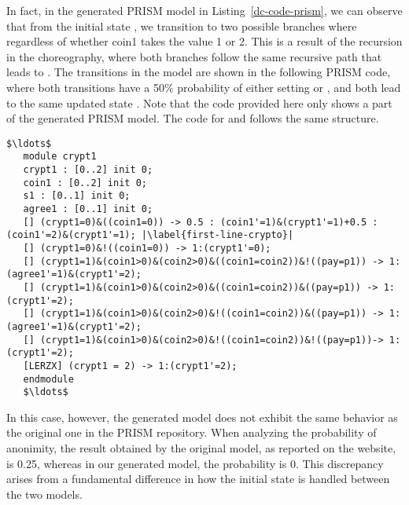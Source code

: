 In fact, in the generated PRISM model in Listing~\ref{dc-code-prism}, we can observe that from the initial state , we transition to two possible branches where  regardless of whether coin1 takes the value 1 or 2. This is a result of the recursion in the choreography, where both branches follow the same recursive path that leads to . The transitions in the model are shown in the following PRISM code, where both transitions have a 50$\%$ probability of either setting  or , and both lead to the same updated state . Note that the code provided here only shows a part of the generated PRISM model. The code for  and  follows the same structure.

\begin{lstlisting}[style=prism-color,caption={Generated PRISM program},captionpos=b,label={dc-code-prism},escapechar=|]
   $\ldots$
   module crypt1
   crypt1 : [0..2] init 0;
   coin1 : [0..2] init 0;
   s1 : [0..1] init 0;
   agree1 : [0..1] init 0;
   [] (crypt1=0)&((coin1=0)) -> 0.5 : (coin1'=1)&(crypt1'=1)+0.5 : (coin1'=2)&(crypt1'=1); |\label{first-line-crypto}|
   [] (crypt1=0)&!((coin1=0)) -> 1:(crypt1'=0);
   [] (crypt1=1)&(coin1>0)&(coin2>0)&((coin1=coin2))&!((pay=p1)) -> 1:(agree1'=1)&(crypt1'=2);
   [] (crypt1=1)&(coin1>0)&(coin2>0)&((coin1=coin2))&((pay=p1)) -> 1:(crypt1'=2);
   [] (crypt1=1)&(coin1>0)&(coin2>0)&!((coin1=coin2))&((pay=p1)) -> 1:(agree1'=1)&(crypt1'=2);
   [] (crypt1=1)&(coin1>0)&(coin2>0)&!((coin1=coin2))&!((pay=p1))-> 1:(crypt1'=2);
   [LERZX] (crypt1 = 2) -> 1:(crypt1'=2);
   endmodule
   $\ldots$
\end{lstlisting}

In this case, however, the generated model does not exhibit the same behavior as the original one in the PRISM repository. When analyzing the probability of anonimity, the result obtained by the original model, as reported on the website, is 0.25, whereas in our generated model, the probability is 0. This discrepancy arises from a fundamental difference in how the initial state is handled between the two models.

